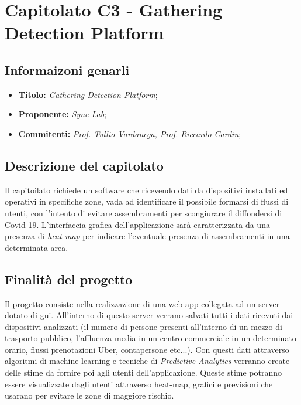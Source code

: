 \section{Capitolato C3 - Gathering Detection Platform}
\subsection{Informaizoni genarli}
\begin{itemize}
    \item \textbf{Titolo:} \textit{Gathering Detection Platform};
    \item \textbf{Proponente:} \textit{Sync Lab};
    \item \textbf{Commitenti:} \textit{Prof. Tullio Vardanega, Prof. Riccardo Cardin};
\end{itemize}
\subsection{Descrizione del capitolato}
Il capitoilato richiede un software che ricevendo dati da dispositivi installati ed operativi in specifiche zone, 
vada ad identificare il possibile formarsi di flussi di utenti, con l'intento di evitare assembramenti per scongiurare il diffondersi di Covid-19.
L'interfaccia grafica dell'applicazione sarà caratterizzata da una presenza di \textit{heat-map} per indicare l'eventuale presenza di assembramenti in una determinata area.
\subsection{Finalità del progetto}
Il progetto consiste nella realizzazione di una web-app collegata ad un server dotato di gui. All'interno di questo server verrano salvati tutti i dati ricevuti dai dispositivi analizzati 
(il numero di persone presenti all'interno di un mezzo di trasporto pubblico, l'affluenza media in un centro commerciale in un determinato orario, flussi prenotazioni Uber, contapersone etc...). 
Con questi dati attraverso algoritmi di machine learning e tecniche di \textit{Predictive Analytics} verranno create delle stime da fornire poi agli utenti dell'applicazione. 
Queste stime potranno essere visualizzate dagli utenti attraverso heat-map, grafici e previsioni che usarano per evitare le zone di maggiore rischio.

